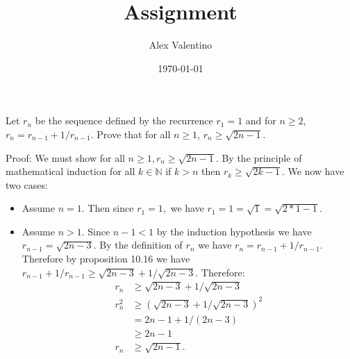 \documentclass[12pt, letterpaper]{article}
\date{\today}
\author{Alex Valentino}
\title{Assignment }
\newcommand{\N}{\mathbb{N}}
\begin{document}
	Let $r_n$ be the sequence defined by the recurrence $r_1=1$ and for $n \geq 2$, $r_n=r_{n-1}+1/r_{n-1}$.  Prove that for all $n \geq 1$, $r_n \geq \sqrt{2n-1}$.
	
	Proof:  We must show for all $n \geq 1, r_n \geq \sqrt{2n-1}.$  By the principle of mathematical induction for all $k \in \N$ if $k > n$ then $r_k \geq \sqrt{2k-1}$.  We now have two cases:
	\begin{itemize}
		\item Assume $n=1$.  Then since $r_1 = 1,$ we have $r_1 = 1 = \sqrt{1} = \sqrt{2*1 -1}.$ 
		\item Assume $n > 1.$  Since $n-1 < 1$ by the induction hypothesis we have $r_{n-1} = \sqrt{2n-3}.$  By the definition of $r_n$ we have $r_n = r_{n-1}+1/r_{n-1}.$  Therefore by proposition 10.16 we have $r_{n-1}+1/r_{n-1} \geq \sqrt{2n-3} + 1/\sqrt{2n-3}$.  Therefore: \begin{align*}
		r_n & \geq \sqrt{2n-3} + 1/\sqrt{2n-3}\\
		r_n^2 & \geq (\sqrt{2n-3} + 1/\sqrt{2n-3})^2\\
		&= 2n-1 + 1/(2n-3)\\
		&\geq 2n-1\\
		r_n &\geq \sqrt{2n-1}.
		\end{align*}
\end{itemize}	 
\end{document}

